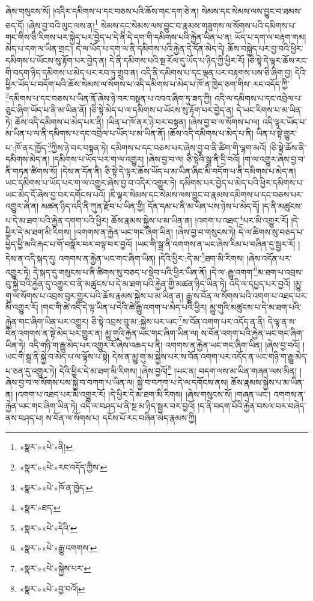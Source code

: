 ཞེས་གསུངས་སོ། །འདིར་དམིགས་པ་དང་བཅས་པའི་ཆོས་གང་དག་ཅེ་ན། སེམས་དང་སེམས་ལས་བྱུང་བ་ཐམས་ཅད་དོ། །ཞེས་བྱ་བའི་ལུང་ལས་ན།\footnote{«སྣར་»«པེ་»ནི།} སེམས་དང་སེམས་ལས་བྱུང་བ་རྣམས་གཟུགས་ལ་སོགས་པའི་དམིགས་པ་གང་གིས་ཅི་རིགས་པར་སྐྱེད་པར་བྱེད་པ་དེ་ནི་དེ་དག་གི་དམིགས་པའི་རྐྱེན་ཡིན་པ་ན། ཡོད་པ་དག་ལ་བརྟག་གམ། མེད་པ་དག་ལ་ཡིན་གྲང་། དེ་ལ་ཡོད་པ་དག་ལ་ནི་དམིགས་པའི་རྐྱེན་དེ་དོན་མེད་དེ། ཆོས་བསྐྱེད་པར་བྱ་བའི་ཕྱིར་དམིགས་པ་ཡོངས་སུ་རྟོག་པར་བྱེད་ན། དེ་ནི་དམིགས་པའི་སྔ་རོལ་དུ་ཡོད་པ་ཉིད་ཀྱི་ཕྱིར་རོ། །ཅི་སྟེ་དེ་ལྟར་ཆོས་རང་གི་བདག་ཉིད་དམིགས་པ་མེད་པར་རབ་ཏུ་གྲུབ་ན། འདི་ནི་དམིགས་པ་དང་ལྡན་པར་བརྟགས་པས་ཅི་ཞིག་བྱ། དེའི་ཕྱིར་ཡོད་པ་བདོག་པའི་ཆོས་སེམས་ལ་སོགས་པ་འདི་དམིགས་པ་མེད་པ་ཁོ་ན་ཁྱེད་ཅག་གིས་:རང་འདོད་ཀྱི་\footnote{«སྣར་»«པེ་»རང་འདོད་ཀྱིས་}དམིགས་པ་དང་བཅས་པ་ཡིན་ནོ་ཞེས་ཉེ་བར་བསྟན་པ་འབའ་ཞིག་ཏུ་ཟད་ཀྱི། འདི་ལ་དམིགས་པ་དང་འབྲེལ་པ་ཅུང་ཞིག་ཡོད་པ་ནི་མ་ཡིན་ནོ། །ཅི་སྟེ་མེད་པ་ལ་དམིགས་པ་ཡོངས་སུ་རྟོག་པར་བྱེད་ན། དེ་ཡང་རིགས་པ་མ་ཡིན་ཏེ། ཆོས་འདི་དམིགས་པ་མེད་པར་ནི། །ཡིན་པ་ཁོ་ནར་ཉེ་བར་བསྟན། །ཞེས་བྱ་བ་ལ་སོགས་པ་ལ། འདི་ལྟར་ཡོད་པ་མ་ཡིན་པ་ལ་ནི་དམིགས་པ་དང་འབྲེལ་པ་ཡོད་པ་མ་ཡིན་ནོ། །ཆོས་འདི་དམིགས་པ་མེད་པ་ནི། ཡིན་པ་སྟེ་གྱུར་པ་:ཁོ་ནར་ཁྱོད་\footnote{«སྣར་»«པེ་»ཁོ་ན་ཁྱེད་}ཀྱིས་ཉེ་བར་བསྟན་ཏེ། དམིགས་པ་དང་བཅས་པར་ཞེས་བྱ་བ་ནི་ཚིག་གི་ལྷག་མའོ། །ཅི་སྟེ་ཆོས་ནི་དམིགས་མེད་ན། །དམིགས་པ་ཡོད་པར་ག་ལ་འགྱུར། །ཞེས་བྱ་བ་ལ། ཅི་སྟེའི་སྒྲ་ནི་དྲི་བའོ། །ག་ལ་འགྱུར་ཞེས་བྱ་བ་ནི་གཏན་ཚིགས་སོ། །དེས་ན་དོན་ནི། ཅི་སྟེ་དེ་ལྟར་ཆོས་ཡོད་པ་མ་ཡིན་ཞིང་མི་བདོག་པ་ནི་དམིགས་པ་མེད་ན། ཡང་དམིགས་པ་ཡོད་པར་ག་ལ་འགྱུར་ཞེས་བྱ་བ་འདིར་འགྱུར་ཏེ། དམིགས་པར་བྱེད་པ་མེད་པའི་ཕྱིར་དམིགས་པ་ཡང་མེད་དོ་ཞེས་བྱ་བར་དགོངས་པའོ། །ཇི་ལྟར་སེམས་དང་སེམས་ལས་བྱུང་བ་རྣམས་དམིགས་པ་དང་བཅས་པར་འགྱུར་ཞེ་ན། མཚན་ཉིད་འདི་ནི་ཀུན་རྫོབ་པ་ཡིན་གྱི། དོན་དམ་པ་ནི་མ་ཡིན་པས་ཉེས་པ་མེད་དོ། །ད་ནི་མཚུངས་པ་དེ་མ་ཐག་པའི་རྐྱེན་དགག་པའི་ཕྱིར། ཆོས་རྣམས་སྐྱེས་པ་མ་ཡིན་ན། །འགག་པ་འཐད་\footnote{«སྣར་»ཐད་}པར་མི་འགྱུར་རོ། །དེ་ཕྱིར་དེ་མ་ཐག་མི་རིགས། །འགགས་ན་རྐྱེན་ཡང་གང་ཞིག་ཡིན། །ཞེས་བྱ་བ་གསུངས་ཏེ། དེ་ལ་ཚིགས་སུ་བཅད་པ་ཕྱེད་ཕྱི་མའི་རྐང་པ་གོ་བསྣོར་བར་བལྟ་བར་བྱའོ། །ཡང་གི་སྒྲ་ནི་འགགས་ན་ཡང་ཞེས་རིམ་པ་བཞིན་དུ་སྦྱར་རོ། །དེས་ན་འདི་སྐད་དུ། འགགས་ན་རྐྱེན་ཡང་གང་ཞིག་ཡིན། །དེའི་ཕྱིར་:དེ་མ་\footnote{«སྣར་»«པེ་»དེའི་}ཐག་མི་རིགས། །ཞེས་འདོན་པར་འགྱུར་ཏེ། དེ་སྐད་དུ་གསུངས་པ་ནི་ཚིགས་སུ་བཅད་པ་སྡེབ་པའི་ཕྱིར་ཡིན་ནོ། །དེ་ལ་:རྒྱུ་འགག་\footnote{«སྣར་»«པེ་»རྒྱུ་འགགས་}མ་ཐག་པ་འབྲས་བུ་སྐྱེ་བའི་རྐྱེན་དུ་འགྱུར་བ་ནི་མཚུངས་པ་དེ་མ་ཐག་པའི་རྐྱེན་གྱི་མཚན་ཉིད་ཡིན་ཏེ། འདི་ལ་དཔྱད་པར་བྱའོ། །མྱུ་གུ་ལ་སོགས་པ་འབྲས་བུར་གྱུར་པའི་ཆོས་རྣམས་སྐྱེས་པ་མ་ཡིན་ན། རྒྱུ་ས་བོན་ལ་སོགས་པའི་འགག་པ་འཐད་པར་མི་འགྱུར་རོ། །གང་གི་ཚེ་འདི་དེ་ལྟ་ཡིན་པ་དེའི་ཚེ་རྒྱུ་འགག་པ་མེད་པའི་ཕྱིར། མྱུ་གུའི་མཚུངས་པ་དེ་མ་ཐག་པའི་རྐྱེན་གང་ཞིག་ཡིན་པར་འགྱུར། ཅི་སྟེ་འབྲས་བུ་མ་:སྐྱེས་པར་ཡང་\footnote{«སྣར་»«པེ་»སྐྱེས་པར་}ས་བོན་འགག་པར་འདོད་ན་ནི། དེ་ལྟ་ན་ས་བོན་འགགས་ན་སྟེ་མེད་པར་གྱུར་ན། མྱུ་གུའི་རྐྱེན་ཡང་གང་ཞིག་ཡིན་ལ། ས་བོན་འགག་པའི་རྐྱེན་ཡང་གང་ཞིག་ཡིན་ཏེ། འདི་གཉི་ག་རྒྱུ་མེད་པར་འགྱུར་རོ་ཞེས་འཆད་པ་ནི། འགགས་ན་རྐྱེན་ཡང་གང་ཞིག་ཡིན། །ཞེས་བྱ་བའོ། །ཡང་གི་སྒྲ་ནི་སྐྱེ་བ་མེད་པ་ལ་ལྟོས་པ་སྟེ། དེས་ན་མྱུ་གུ་མ་སྐྱེས་པར་ས་བོན་འགག་པར་འདོད་ན་ཡང་གཉི་ག་རྒྱུ་མེད་པ་ཅན་དུ་འགྱུར་ཏེ། དེའི་ཕྱིར་དེ་མ་ཐག་མི་རིགས། །ཞེས་བྱའོ།\footnote{«སྣར་»«པེ་»བྱ་བའོ།} །ཡང་ན། བདག་ལས་མ་ཡིན་གཞན་ལས་མིན། །ཞེས་བྱ་བ་ལ་སོགས་པས་སྐྱེ་བ་བཀག་པ་ཡིན་ལ། སྐྱེ་བ་བཀག་པ་དེ་ལ་དགོངས་ནས། ཆོས་རྣམས་སྐྱེས་པ་མ་ཡིན་ན། །འགག་པ་འཐད་པར་མི་འགྱུར་རོ། །དེ་ཕྱིར་དེ་མ་ཐག་མི་རིགས། །ཞེས་གསུངས་སོ། །གཞན་ཡང་། འགགས་ན་རྐྱེན་ཡང་གང་ཞིག་ཡིན་ཏེ། འདི་ལ་བཤད་པ་ནི་སྔ་མ་ཉིད་སྦྱར་བར་བྱའོ། །ད་ནི་བདག་པོའི་རྐྱེན་བསལ་བར་བཞེད་ནས་བཤད་པ། ས་བོན་ལ་སོགས་པ། དངོས་པོ་རང་བཞིན་མེད་རྣམས་ཀྱི། 